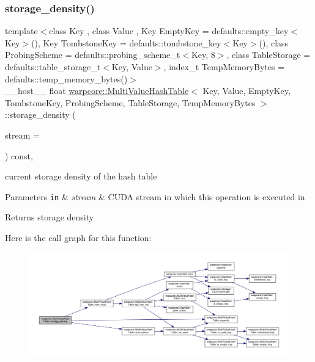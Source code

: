 \subsubsection{\texorpdfstring{storage\+\_\+density()}{storage\_density()}}
{\footnotesize\ttfamily template$<$class Key , class Value , Key Empty\+Key = defaults\+::empty\+\_\+key$<$\+Key$>$(), Key Tombstone\+Key = defaults\+::tombstone\+\_\+key$<$\+Key$>$(), class Probing\+Scheme  = defaults\+::probing\+\_\+scheme\+\_\+t$<$\+Key, 8$>$, class Table\+Storage  = defaults\+::table\+\_\+storage\+\_\+t$<$\+Key, Value$>$, index\+\_\+t Temp\+Memory\+Bytes = defaults\+::temp\+\_\+memory\+\_\+bytes()$>$ \\
\+\_\+\+\_\+host\+\_\+\+\_\+ float \hyperlink{classwarpcore_1_1MultiValueHashTable}{warpcore\+::\+Multi\+Value\+Hash\+Table}$<$ Key, Value, Empty\+Key, Tombstone\+Key, Probing\+Scheme, Table\+Storage, Temp\+Memory\+Bytes $>$\+::storage\+\_\+density (\begin{DoxyParamCaption}\item[{const cuda\+Stream\+\_\+t}]{stream = {} }\end{DoxyParamCaption}) const\hspace{0.3cm}{\ttfamily [inline]}, {\ttfamily [noexcept]}}



current storage density of the hash table 


\begin{DoxyParams}[1]{Parameters}
\mbox{\tt in}  & {\em stream} & C\+U\+DA stream in which this operation is executed in \\
\hline
\end{DoxyParams}
\begin{DoxyReturn}{Returns}
storage density 
\end{DoxyReturn}
Here is the call graph for this function\+:
\nopagebreak
\begin{figure}[H]
\begin{center}
\leavevmode
\includegraphics[width=350pt]{classwarpcore_1_1MultiValueHashTable_a7f8d4c186530fe60ead1e52f9629622c_cgraph}
\end{center}
\end{figure}
\mbox{\label{classwarpcore_1_1MultiValueHashTable_a9eec07133f3b950b5c6465e4b8b53e78}} 
